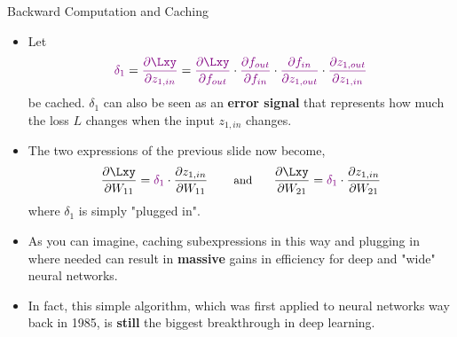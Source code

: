 \begin{frame} {Backward Computation and Caching}
  \begin{itemize}
    \item Let
      {\small $$\textcolor{violet}{\delta_1}  = \textcolor{violet}{\frac{\partial \Lxy}{\partial z_{1,in}}} = 
 \textcolor{violet}{\frac{\partial \Lxy}{\partial f_{out}}} \cdot  \textcolor{violet}{\frac{\partial f_{out}}{\partial f_{in}}} \cdot  \textcolor{violet}{\frac{\partial f_{in}}{\partial z_{1,out}}} \cdot  \textcolor{violet}{\frac{\partial z_{1,out}}{\partial z_{1,in}}}        
        $$}
    be cached. $\delta_1$ can also be seen as an \textbf{error signal} that represents how much the loss $L$ changes when the input $z_{1,in}$ changes.  
    \item The two expressions of the previous slide now become,
    {\small
    $$\frac{\partial \Lxy}{\partial W_{11}} = 
          \textcolor{violet}{\delta_1} \cdot \frac{\partial z_{1,in}}{\partial W_{11}}  \mbox{ \hspace{0.5cm} \small{and} \hspace{0.5cm}}
     \frac{\partial \Lxy}{\partial W_{21}} = 
        \textcolor{violet}{\delta_1} \cdot \frac{\partial z_{1,in}}{\partial W_{21}} $$}
        where $\delta_1$ is simply "plugged in".
    \item As you can imagine, caching subexpressions in this way and plugging in where needed can result in \textbf{massive} gains in efficiency for deep and "wide" neural networks. 
    \item In fact, this simple algorithm, which was first applied to neural networks way back in 1985, is \textbf{still} the biggest breakthrough in deep learning.
  \end{itemize}
\end{frame}
